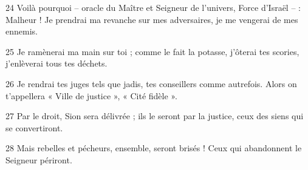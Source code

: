 
24 Voilà pourquoi – oracle du Maître et Seigneur de l’univers, Force d’Israël – : Malheur ! Je prendrai ma revanche sur mes adversaires, je me vengerai de mes ennemis.

25 Je ramènerai ma main sur toi ; comme le fait la potasse, j’ôterai tes scories, j’enlèverai tous tes déchets.

26 Je rendrai tes juges tels que jadis, tes conseillers comme autrefois. Alors on t’appellera « Ville de justice », « Cité fidèle ».

27 Par le droit, Sion sera délivrée ; ils le seront par la justice, ceux des siens qui se convertiront.

28 Mais rebelles et pécheurs, ensemble, seront brisés ! Ceux qui abandonnent le Seigneur périront.